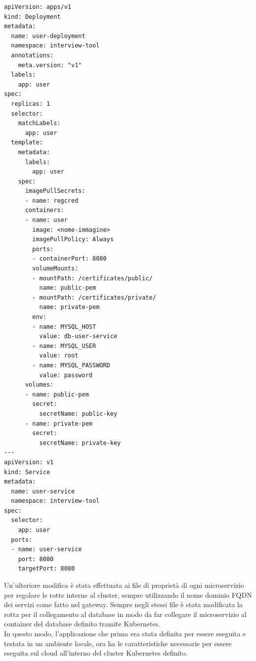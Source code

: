 \documentclass[a4paper,12pt]{report}
\begin{document}
\begin{lstlisting}[caption={\\\textit{Manifesto YAML definito per uno dei quattro microservizi chiamato user.\\ Nella prima parte è definito un oggetto di tipo deployment che presenta le specifiche del container, a partire dal nome, namespace fino all'immagine che dovrà esserci montata sopra.\\ Sempre sul deployment sono stati definiti anche dei volumi per montare delle chiavi necessarie per il microservizio, oltre a delle variabili d'ambiente per richiamare il database.\\ Nella seconda parte del manifesto è definito un oggetto di tipo service per esporre sulla porta 8080.}}]
apiVersion: apps/v1
kind: Deployment
metadata:
  name: user-deployment
  namespace: interview-tool
  annotations:
    meta.version: "v1"
  labels:
    app: user
spec:
  replicas: 1
  selector:
    matchLabels:
      app: user
  template:
    metadata:
      labels:
        app: user
    spec:
      imagePullSecrets:
      - name: regcred
      containers:
      - name: user
        image: <nome-immagine>
        imagePullPolicy: Always
        ports:
        - containerPort: 8080
        volumeMounts:
        - mountPath: /certificates/public/
          name: public-pem
        - mountPath: /certificates/private/
          name: private-pem
        env:
        - name: MYSQL_HOST
          value: db-user-service
        - name: MYSQL_USER
          value: root
        - name: MYSQL_PASSWORD
          value: password
      volumes:
      - name: public-pem
        secret:
          secretName: public-key
      - name: private-pem
        secret:
          secretName: private-key        
---
apiVersion: v1
kind: Service
metadata:
  name: user-service
  namespace: interview-tool
spec:
  selector:
    app: user
  ports:
  - name: user-service
    port: 8080
    targetPort: 8080
\end{lstlisting}
Un'ulteriore modifica è stata effettuata ai file di proprietà di ogni microservizio per regolare le rotte interne al cluster, sempre utilizzando il nome dominio FQDN dei servizi come fatto nel gateway. Sempre negli stessi file è stata modificata la rotta per il collegamento al database in modo da far collegare il microservizio al container del database definito tramite Kubernetes.\\
In questo modo, l'applicazione che prima era stata definita per essere eseguita e testata in un ambiente locale, ora ha le caratteristiche necessarie per essere eseguita sul cloud all'interno del cluster Kubernetes definito. \\ \\ 
\end{document}
